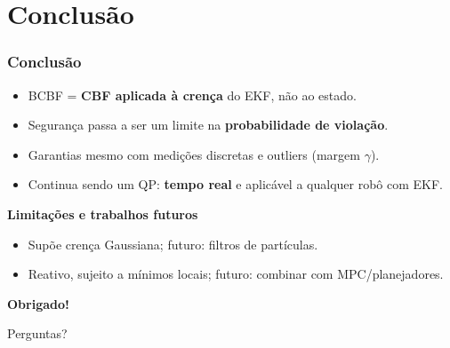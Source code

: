 \section{Conclusão}

\begin{frame}

    \frametitle{Conclusão}

    \begin{itemize}
        \item BCBF = \textbf{CBF aplicada à crença} do EKF, não ao estado.
        \item Segurança passa a ser um limite na \textbf{probabilidade de violação}.
        \item Garantias mesmo com medições discretas e outliers (margem $\gamma$).
        \item Continua sendo um QP: \textbf{tempo real} e aplicável a qualquer robô com EKF.
    \end{itemize}

    \vspace{3mm}

    \textbf{Limitações e trabalhos futuros}
    \begin{itemize}
        \item Supõe crença Gaussiana; futuro: filtros de partículas.
        \item Reativo, sujeito a mínimos locais; futuro: combinar com MPC/planejadores.
    \end{itemize}

\end{frame}


\begin{frame}[plain]

    \centering
    \vfill
    {\Huge \textbf{\color{IFSPPrimario}Obrigado!}}

    \vspace{5mm}

    {\large Perguntas?}
    \vfill

\end{frame}
